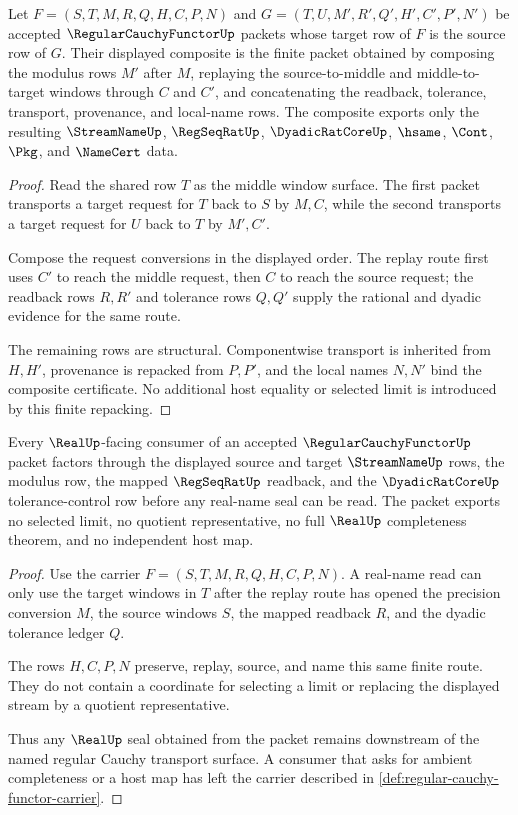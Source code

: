 \begin{theorem}
\label{thm:regular-cauchy-functor-composition-law}
Let $F=(S,T,M,R,Q,H,C,P,N)$ and $G=(T,U,M',R',Q',H',C',P',N')$ be accepted $\RegularCauchyFunctorUp$ packets whose target row of $F$ is the source row of $G$. Their displayed composite is the finite packet obtained by composing the modulus rows $M'$ after $M$, replaying the source-to-middle and middle-to-target windows through $C$ and $C'$, and concatenating the readback, tolerance, transport, provenance, and local-name rows. The composite exports only the resulting $\StreamNameUp$, $\RegSeqRatUp$, $\DyadicRatCoreUp$, $\hsame$, $\Cont$, $\Pkg$, and $\NameCert$ data.
\end{theorem}
\begin{proof}
Read the shared row $T$ as the middle window surface. The first packet transports a target request for $T$ back to $S$ by $M,C$, while the second transports a target request for $U$ back to $T$ by $M',C'$.

Compose the request conversions in the displayed order. The replay route first uses $C'$ to reach the middle request, then $C$ to reach the source request; the readback rows $R,R'$ and tolerance rows $Q,Q'$ supply the rational and dyadic evidence for the same route.

The remaining rows are structural. Componentwise transport is inherited from $H,H'$, provenance is repacked from $P,P'$, and the local names $N,N'$ bind the composite certificate. No additional host equality or selected limit is introduced by this finite repacking.
\end{proof}

\begin{theorem}
\label{thm:regular-cauchy-functor-real-seal-nonescape}
Every $\RealUp$-facing consumer of an accepted $\RegularCauchyFunctorUp$ packet factors through the displayed source and target $\StreamNameUp$ rows, the modulus row, the mapped $\RegSeqRatUp$ readback, and the $\DyadicRatCoreUp$ tolerance-control row before any real-name seal can be read. The packet exports no selected limit, no quotient representative, no full $\RealUp$ completeness theorem, and no independent host map.
\end{theorem}
\begin{proof}
Use the carrier $F=(S,T,M,R,Q,H,C,P,N)$. A real-name read can only use the target windows in $T$ after the replay route has opened the precision conversion $M$, the source windows $S$, the mapped readback $R$, and the dyadic tolerance ledger $Q$.

The rows $H,C,P,N$ preserve, replay, source, and name this same finite route. They do not contain a coordinate for selecting a limit or replacing the displayed stream by a quotient representative.

Thus any $\RealUp$ seal obtained from the packet remains downstream of the named regular Cauchy transport surface. A consumer that asks for ambient completeness or a host map has left the carrier described in \autoref{def:regular-cauchy-functor-carrier}.
\end{proof}

